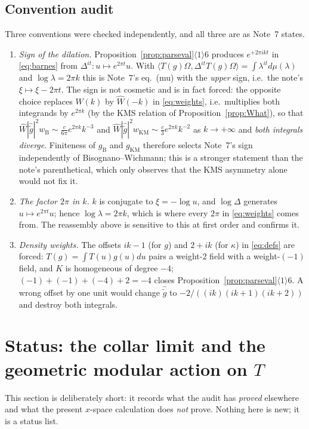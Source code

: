 \documentclass[11pt]{article}
\newcommand{\Wh}{\widehat W}
\newcommand{\gh}{\widehat{\widetilde g}}
\newcommand{\Om}{\Omega}
\newcommand{\gB}{g_{\mathrm B}}
\newcommand{\gKM}{g_{\mathrm{KM}}}
\begin{document}
\subsection{Convention audit}\label{sec:signs}
Three conventions were checked independently, and all three are as Note~7 states.
\begin{enumerate}[leftmargin=1.6em]
\item \emph{Sign of the dilation.}  Proposition~\ref{prop:parseval}$\langle1\rangle6$ produces
$e^{+2\pi ikt}$ in \eqref{eq:barnes} from $\Delta^{it}:u\mapsto e^{2\pi t}u$.  With
$\langle T(g)\Om,\Delta^{it}T(g)\Om\rangle=\int\lambda^{it}d\mu(\lambda)$ and $\log\lambda=2\pi k$ this
is Note~7's eq.~(mu) with the \emph{upper} sign, i.e.\ the note's $\xi\mapsto\xi-2\pi t$.  The sign is
not cosmetic and is in fact forced: the opposite choice replaces $\Wh(k)$ by $\Wh(-k)$ in
\eqref{eq:weights}, i.e.\ multiplies both integrands by $e^{2\pi k}$ (by the KMS relation of
Proposition~\ref{prop:What}), so that $\Wh|\gh|^2w_{\mathrm B}\sim\frac{c}{6\pi}e^{2\pi k}k^{-3}$ and
$\Wh|\gh|^2w_{\mathrm{KM}}\sim\frac{c}{3}e^{2\pi k}k^{-2}$ as $k\to+\infty$ and \emph{both integrals
diverge}.  Finiteness of $\gB$ and $\gKM$ therefore selects Note~7's sign independently of
Bisognano--Wichmann; this is a stronger statement than the note's parenthetical, which only observes
that the KMS asymmetry alone would not fix it.
\item \emph{The factor $2\pi$ in $k$.}  $k$ is conjugate to $\xi=-\log u$, and $\log\Delta$ generates
$u\mapsto e^{2\pi t}u$; hence $\log\lambda=2\pi k$, which is where every $2\pi$ in \eqref{eq:weights}
comes from.  The reassembly above is sensitive to this at first order and confirms it.
\item \emph{Density weights.}  The offsets $ik-1$ (for $g$) and $2+ik$ (for $\kappa$) in
\eqref{eq:defs} are forced: $T(g)=\int T(u)g(u)du$ pairs a weight-$2$ field with a weight-$(-1)$
field, and $K$ is homogeneous of degree $-4$; $(-1)+(-1)+(-4)+2=-4$ closes
Proposition~\ref{prop:parseval}$\langle1\rangle6$.  A wrong offset by one unit would change
$\gh$ to $-2/((ik)(ik+1)(ik+2))$ and destroy both integrals.
\end{enumerate}

\section{Status: the collar limit and the geometric modular action on $T$}\label{sec:collar}

This section is deliberately short: it records what the audit has \emph{proved} elsewhere and what the
present $x$-space calculation does \emph{not} prove.  Nothing here is new; it is a status list.
\end{document}
